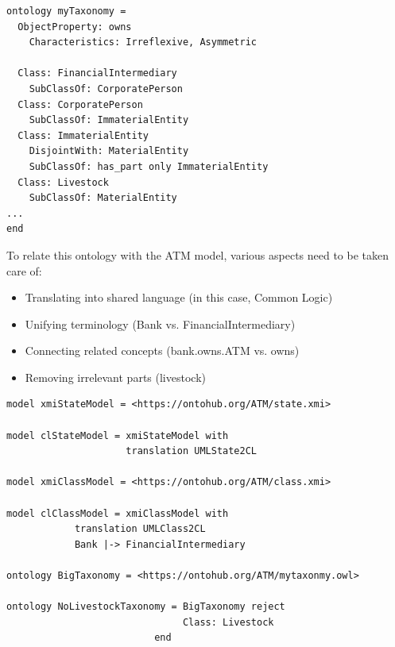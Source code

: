 \documentclass[10pt,fleqn,final]{scrreprt}
\newenvironment{definitions}[0]{\medskip }{}
\begin{document}
\begin{definitions}
\begin{lstlisting}[basicstyle=\ttfamily,language=dolText,morekeywords={props,ObjectProperty,Class,DisjointUnionOf,SubClassOf,DisjointWith, Irreflexive, Characteristics,Transitive,Asymmetric,SubPropertyOf,DisjointClasses,EquivalentTo,inverse,only,forall,iff,if,or,exists,sort,ops,in,approximate,extract},escapechar=@,mathescape]
ontology myTaxonomy =
  ObjectProperty: owns 
    Characteristics: Irreflexive, Asymmetric

  Class: FinancialIntermediary
    SubClassOf: CorporatePerson 
  Class: CorporatePerson
    SubClassOf: ImmaterialEntity
  Class: ImmaterialEntity
    DisjointWith: MaterialEntity
    SubClassOf: has_part only ImmaterialEntity
  Class: Livestock 	
    SubClassOf: MaterialEntity 
...
end
\end{lstlisting}

 To relate this ontology with the ATM model, 
various aspects need to be taken care of:
\begin{itemize}
  \item Translating into shared language  (in this case, Common Logic)
  \item Unifying terminology (Bank vs. FinancialIntermediary)
  \item Connecting related concepts (bank.owns.ATM vs. owns)
  \item Removing irrelevant parts (livestock) 
\end{itemize}

\begin{lstlisting}[basicstyle=\ttfamily\small,language=dolText,morekeywords={props,ObjectProperty,Class,DisjointUnionOf,SubClassOf,DisjointWith, OMS, Characteristics,Transitive,Asymmetric,translation,SubPropertyOf,DisjointClasses,EquivalentTo,inverse,only,forall,iff,if,or,exists,sort,ops,in,approximate,extract,oms,model},escapechar=@,mathescape]
model xmiStateModel = <https://ontohub.org/ATM/state.xmi>

model clStateModel = xmiStateModel with
                     translation UMLState2CL

model xmiClassModel = <https://ontohub.org/ATM/class.xmi>			

model clClassModel = xmiClassModel with 
            translation UMLClass2CL 
            Bank |-> FinancialIntermediary

ontology BigTaxonomy = <https://ontohub.org/ATM/mytaxonmy.owl>			

ontology NoLivestockTaxonomy = BigTaxonomy reject
                               Class: Livestock
						  end


\end{lstlisting}
\end{definitions}
\end{document}
